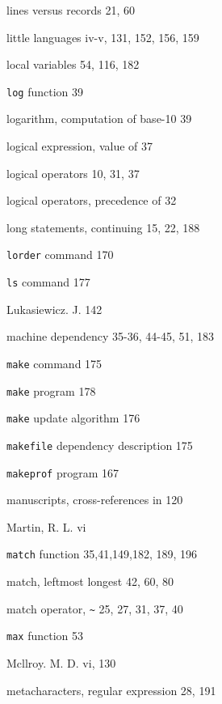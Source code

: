 \begin{multicols}{3}
\hangindent=3pc  lines versus records 21, 60

\hangindent=3pc  little languages iv-v, 131, 152, 156, 159

\hangindent=3pc  local variables 54, 116, 182

\hangindent=3pc  \verb'log' function 39

\hangindent=3pc  logarithm, computation of base-10 39

\hangindent=3pc  logical expression, value of 37

\hangindent=3pc  logical operators 10, 31, 37

\hangindent=3pc  logical operators, precedence of 32

\hangindent=3pc  long statements, continuing 15, 22, 188

\hangindent=3pc  \verb'lorder' command 170

\hangindent=3pc  \verb'ls' command 177

\hangindent=3pc  Lukasiewicz. J. 142

\hangindent=3pc  machine dependency 35-36, 44-45, 51, 183

\hangindent=3pc  \verb'make' command 175

\hangindent=3pc  \verb'make' program 178

\hangindent=3pc  \verb'make' update algorithm 176

\hangindent=3pc  \verb'makefile' dependency description 175

\hangindent=3pc  \verb'makeprof' program 167

\hangindent=3pc  manuscripts, cross-references in 120

\hangindent=3pc  Martin, R. L. vi

\hangindent=3pc  \verb'match' function 35,41,149,182, 189, 196

\hangindent=3pc  match, leftmost longest 42, 60, 80

\hangindent=3pc  match operator, \verb'~' 25, 27, 31, 37, 40

\hangindent=3pc  \verb'max' function 53

\hangindent=3pc  Mcllroy. M. D. vi, 130

\hangindent=3pc  metacharacters, regular expression 28, 191


\end{multicols}
